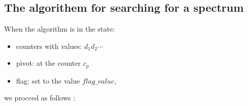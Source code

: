 \subsection{The algorithem for searching for a spectrum}
\label{the algorithm for searching the spectrum itself}
When the algorithm is in the state: 
\begin{itemize}
\item counters with values: $d_1d_2\cdots$
\item pivot: at the counter $c_p$
\item flag: set to the value $flag\_value$,
\end{itemize}
we procced as follows 
:
